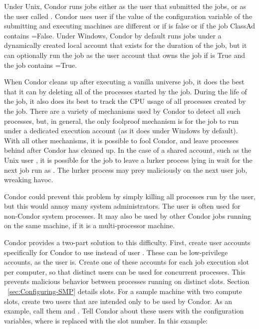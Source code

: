 Under Unix, Condor runs jobs either as the user that submitted the
jobs, or as the user called .  Condor uses user
 if the value of the  configuration
variable of the submitting and executing machines are different or if
 is false or if the job ClassAd
contains =False.  Under Windows, Condor by default
runs jobs under a dynamically created local account that exists for
the duration of the job, but it can optionally run the job as the user
account that owns the job if  is
True and the job contains =True.

When Condor cleans up after executing a vanilla universe job, it does
the best that it can by deleting all of the processes started by the
job.  During the life of the job, it also does its best to track the
CPU usage of all processes created by the job.  There are a variety of
mechanisms used by Condor to detect all such processes, but, in
general, the only foolproof mechanism is for the job to run under a
dedicated execution account (as it does under Windows by default).
With all other mechanisms, it is possible to fool Condor, and leave
processes behind after Condor has cleaned up.  In the case of a shared
account, such as the Unix user , it is possible for the
job to leave a lurker process lying in wait for the next job run as
.  The lurker process may prey maliciously on the next
 user job, wreaking havoc.

Condor could prevent this problem by simply killing all processes run by
the  user, but this would annoy many system administrators.
The  user is often used for non-Condor system processes.
It may also be used by other Condor jobs running on the same machine, if
it is a multi-processor machine.

Condor provides a two-part solution to this difficulty.
First, create user accounts specifically for Condor to use instead
of user .
These can be low-privilege accounts,
as the  user is.
Create one of these accounts for each job execution slot per computer,
so that distinct users can be used for concurrent processes.
This prevents malicious behavior between
processes running on distinct slots.
Section ~\ref{sec:Configuring-SMP} details slots.
For a sample machine with two compute slots,
create two users that are intended only to be used by Condor.
As an example, call them  and .
Tell Condor about these users
with the  configuration variables,
where  is replaced with the slot number.
In this example:

